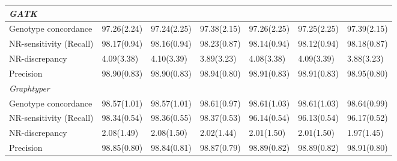\documentclass[../main.tex]{subfiles}
\begin{document}
\begin{flushleft}
\begin{landscape}
\begin{table}
\begin{tabular}{|l|l|l|l|l|l|l|}
    \hline
    \multicolumn{7}{|l|}{\textit{GATK}}                                                                                                                                                                        \\ 
    \hline
    Genotype concordance    & 97.26(2.24)                & 97.24(2.25)                 & 97.38(2.15)                 & 97.26(2.25)                & 97.25(2.25)                 & 97.39(2.15)                  \\ 
    \hline
    NR-sensitivity (Recall) & 98.17(0.94)                & 98.16(0.94)                 & 98.23(0.87)                 & 98.14(0.94)                & 98.12(0.94)                 & 98.18(0.87)                  \\ 
    \hline
    NR-discrepancy          & 4.09(3.38)                 & 4.10(3.39)                  & 3.89(3.23)                  & 4.08(3.38)                 & 4.09(3.39)                  & 3.88(3.23)                   \\ 
    \hline
    Precision               & 98.90(0.83)                & 98.90(0.83)                 & 98.94(0.80)                 & 98.91(0.83)                & 98.91(0.83)                 & 98.95(0.80)                  \\ 
    \hline
    \multicolumn{7}{|l|}{\textit{Graphtyper}}                                                                                                                                                                  \\ 
    \hline
    Genotype concordance    & 98.57(1.01)                & 98.57(1.01)                 & 98.61(0.97)                 & 98.61(1.03)                & 98.61(1.03)                 & 98.64(0.99)                  \\ 
    \hline
    NR-sensitivity (Recall) & 98.34(0.54)                & 98.36(0.55)                 & 98.37(0.53)                 & 96.14(0.54)                & 96.13(0.54)                 & 96.17(0.52)                  \\ 
    \hline
    NR-discrepancy          & 2.08(1.49)                 & 2.08(1.50)                  & 2.02(1.44)                  & 2.01(1.50)                 & 2.01(1.50)                  & 1.97(1.45)                   \\ 
    \hline
    Precision               & 98.85(0.80)                & 98.84(0.81)                 & 98.87(0.79)                 & 98.89(0.82)                & 98.89(0.82)                 & 98.91(0.80)                  \\
    \hline
    \end{tabular}
\end{table}
\end{landscape}


\end{flushleft}
\end{document}
